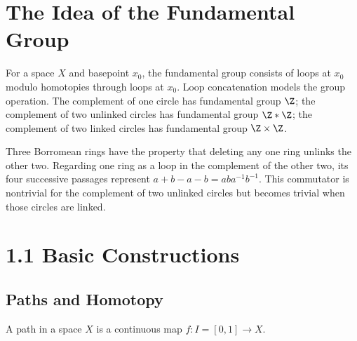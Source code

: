 
\section*{The Idea of the Fundamental Group}

For a space $X$ and basepoint $x_0$, the fundamental group consists of loops at
$x_0$ modulo homotopies through loops at $x_0$. Loop concatenation models the
group operation. The complement of one circle has fundamental group $\Z$; the
complement of two unlinked circles has fundamental group $\Z*\Z$; the
complement of two linked circles has fundamental group $\Z\times\Z$.

\begin{example}
\label{ex:borromean-rings-commutator}
Three Borromean rings have the property that deleting any one ring unlinks
the other two.  Regarding one ring as a loop in the complement of the other
two, its four successive passages represent
$a+b-a-b=aba^{-1}b^{-1}$.  This commutator is nontrivial for the complement
of two unlinked circles but becomes trivial when those circles are linked.
\end{example}

\section{1.1 Basic Constructions}
\label{sec:basic-constructions}

\subsection*{Paths and Homotopy}

\begin{definition}[Path]
\label{def:path}
\leanok
{}
A path in a space $X$ is a continuous map $f:I=[0,1]\to X$.
\end{definition}

